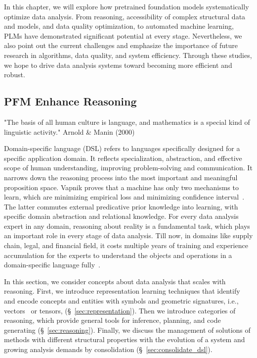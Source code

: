   In this chapter, we will explore how pretrained foundation models systematically optimize data analysis. From reasoning, accessibility of complex structural data and models, and data quality optimization, to automated machine learning, PLMs have demonstrated significant potential at every stage. Nevertheless, we also point out the current challenges and emphasize the importance of future research in algorithms, data quality, and system efficiency. Through these studies, we hope to drive data analysis systems toward becoming more efficient and robust.
  
  \subsection{PFM Enhance Reasoning}\label{sec:dsl}
  
  "The basis of all human culture is language, and mathematics is a special kind of linguistic activity." Arnold \& Manin (2000)
  
Domain-specific language (DSL) refers to languages specifically designed for a specific application domain. It reflects specialization, abstraction, and effective scope of human understanding, improving problem-solving and communication. It narrows down the reasoning process into the most important and meaningful proposition space. Vapnik proves that a machine has only two mechanisms to learn, which are minimizing empirical loss and minimizing confidence interval~\cite{vapnik2019rethinking}. The latter commutes external predicative prior knowledge into learning, with specific domain abstraction and relational knowledge. For every data analysis expert in any domain, reasoning about reality is a fundamental task, which plays an important role in every stage of data analysis. Till now, in domains like supply chain, legal, and financial field, it costs multiple years of training and experience accumulation for the experts to understand the objects and operations in a domain-specific language fully~\cite{garcia2010using}. 
  
In this section, we consider concepts about data analysis that scales with reasoning. First, we introduce representation learning techniques that identify and encode concepts and entities with symbols and geometric signatures, i.e., vectors~\cite{TURL} or tensors, (\S~\ref{sec:representation}). Then we introduce categories of reasoning, which provide general tools for inference, planning, and code generating (\S~\ref{sec:reasoning}). Finally, we discuss the management of solutions of methods with different structural properties with the evolution of a system and growing analysis demands by consolidation (\S~\ref{sec:consolidate_dsl}).
  
